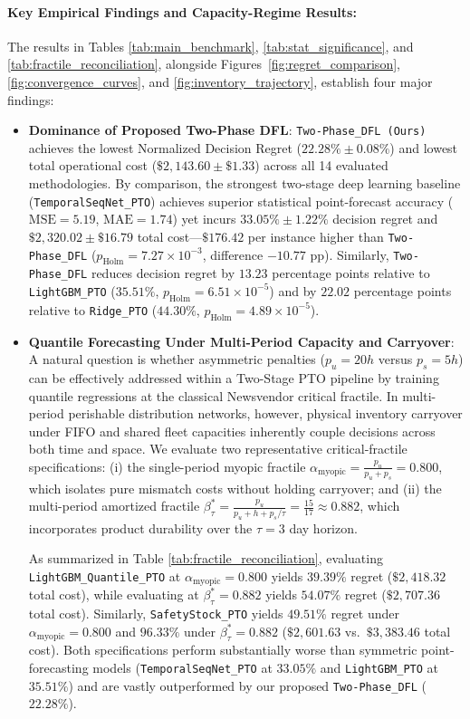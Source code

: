 \documentclass[11pt,a4paper]{article}
\theoremstyle{definition}
\theoremstyle{remark}
\begin{document}
\paragraph{Key Empirical Findings and Capacity-Regime Results:}
The results in Tables \ref{tab:main_benchmark}, \ref{tab:stat_significance}, and \ref{tab:fractile_reconciliation}, alongside Figures~\ref{fig:regret_comparison}, \ref{fig:convergence_curves}, and \ref{fig:inventory_trajectory}, establish four major findings:
\begin{itemize}[leftmargin=*]
    \item \textbf{Dominance of Proposed Two-Phase DFL}: \texttt{Two-Phase\_DFL (Ours)} achieves the lowest Normalized Decision Regret ($22.28\% \pm 0.08\%$) and lowest total operational cost ($\$2,143.60 \pm \$1.33$) across all 14 evaluated methodologies. By comparison, the strongest two-stage deep learning baseline (\texttt{TemporalSeqNet\_PTO}) achieves superior statistical point-forecast accuracy ($\text{MSE} = 5.19$, $\text{MAE} = 1.74$) yet incurs $33.05\% \pm 1.22\%$ decision regret and $\$2,320.02 \pm \$16.79$ total cost—$\$176.42$ per instance higher than \texttt{Two-Phase\_DFL} ($p_{\text{Holm}} = 7.27 \times 10^{-3}$, difference $-10.77$ pp). Similarly, \texttt{Two-Phase\_DFL} reduces decision regret by $13.23$ percentage points relative to \texttt{LightGBM\_PTO} ($35.51\%$, $p_{\text{Holm}} = 6.51 \times 10^{-5}$) and by $22.02$ percentage points relative to \texttt{Ridge\_PTO} ($44.30\%$, $p_{\text{Holm}} = 4.89 \times 10^{-5}$).
    \item \textbf{Quantile Forecasting Under Multi-Period Capacity and Carryover}: A natural question is whether asymmetric penalties ($p_u = 20h$ versus $p_s = 5h$) can be effectively addressed within a Two-Stage PTO pipeline by training quantile regressions at the classical Newsvendor critical fractile. In multi-period perishable distribution networks, however, physical inventory carryover under FIFO and shared fleet capacities inherently couple decisions across both time and space. We evaluate two representative critical-fractile specifications: (i) the single-period myopic fractile $\alpha_{\text{myopic}} = \frac{p_u}{p_u + p_s} = 0.800$, which isolates pure mismatch costs without holding carryover; and (ii) the multi-period amortized fractile $\beta_\tau^* = \frac{p_u}{p_u + h + p_s/\tau} = \frac{15}{17} \approx 0.882$, which incorporates product durability over the $\tau=3$ day horizon.

    As summarized in Table \ref{tab:fractile_reconciliation}, evaluating \texttt{LightGBM\_Quantile\_PTO} at $\alpha_{\text{myopic}} = 0.800$ yields $39.39\%$ regret ($\$2,418.32$ total cost), while evaluating at $\beta_\tau^* = 0.882$ yields $54.07\%$ regret ($\$2,707.36$ total cost). Similarly, \texttt{SafetyStock\_PTO} yields $49.51\%$ regret under $\alpha_{\text{myopic}} = 0.800$ and $96.33\%$ under $\beta_\tau^* = 0.882$ ($\$2,601.63$ vs.\ $\$3,383.46$ total cost). Both specifications perform substantially worse than symmetric point-forecasting models (\texttt{TemporalSeqNet\_PTO} at $33.05\%$ and \texttt{LightGBM\_PTO} at $35.51\%$) and are vastly outperformed by our proposed \texttt{Two-Phase\_DFL} ($22.28\%$). 


\end{itemize}
\end{document}
